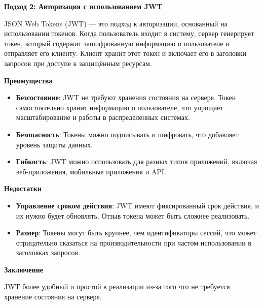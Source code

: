 \textbf{Подход 2: Авторизация с использованием JWT}

JSON Web Tokens (JWT) — это подход к авторизации, основанный на использовании токенов. Когда пользователь входит в систему, сервер генерирует токен, который содержит зашифрованную информацию о пользователе и отправляет его клиенту. Клиент хранит этот токен и включает его в заголовки запросов при доступе к защищённым ресурсам.

\textbf{Преимущества}
\begin{itemize}
    \item \textbf{Безсостояние}: JWT не требуют хранения состояния на сервере. Токен самостоятельно хранит информацию о пользователе, что упрощает масштабирование и работы в распределенных системах.
    \item \textbf{Безопасность}: Токены можно подписывать и шифровать, что добавляет уровень защиты данных.
    \item \textbf{Гибкость}: JWT можно использовать для разных типов приложений, включая веб-приложения, мобильные приложения и API.
\end{itemize}

\textbf{Недостатки}
\begin{itemize}
    \item \textbf{Управление сроком действия}: JWT имеют фиксированный срок действия, и их нужно будет обновлять. Отзыв токена может быть сложнее реализовать.
    \item \textbf{Размер}: Токены могут быть крупнее, чем идентификаторы сессий, что может отрицательно сказаться на производительности при частом использовании в заголовках запросов.
\end{itemize}


\textbf{Заключение}

JWT более удобный и простой в реализации из-за того что не требуется хранение состояния на сервере.





